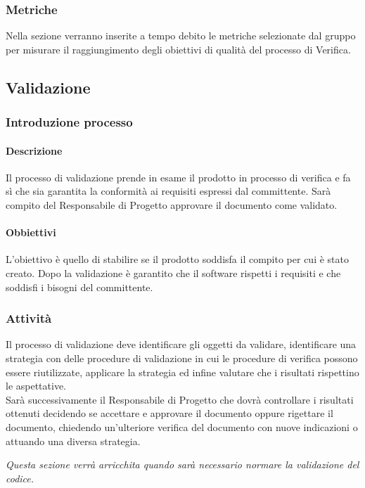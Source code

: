 		\subsubsection{Metriche}
			Nella sezione verranno inserite a tempo debito le metriche selezionate dal gruppo per misurare il raggiungimento degli obiettivi di qualità del processo di Verifica.

	\subsection{Validazione}
		\subsubsection{Introduzione processo}
			\paragraph{Descrizione}
				Il processo di validazione prende in esame il prodotto in processo di verifica e fa sì che sia garantita la conformità ai requisiti espressi dal committente. Sarà compito del Responsabile di Progetto approvare il documento come validato.
			\paragraph{Obbiettivi}
				L’obiettivo è quello di stabilire se il prodotto soddisfa il compito per cui è stato creato. Dopo la validazione è garantito che il software rispetti i requisiti e che soddisfi i bisogni del committente.
		\subsubsection{Attività}
			Il processo di validazione deve identificare gli oggetti da validare, identificare una strategia con delle procedure di validazione in cui le procedure di verifica possono essere riutilizzate, applicare la strategia ed infine valutare che i risultati rispettino le aspettative.\\
			Sarà successivamente il Responsabile di Progetto che dovrà controllare i risultati ottenuti decidendo se accettare e approvare il documento oppure rigettare il documento, chiedendo un’ulteriore verifica del documento con nuove indicazioni o attuando una diversa strategia.\\
		\begin{center}
			\emph{Questa sezione verrà arricchita quando sarà necessario normare la validazione del codice.}
		\end{center}
\newpage
			
			
			
			
			